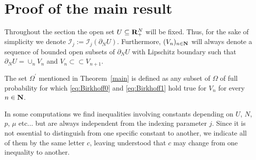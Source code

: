\documentclass[10pt,reqno]{amsart}
\numberwithin{equation}{section}
\def\N{{\bf N}}
\def\R{{\bf R}}
\def\Om{\Omega}
\def\Ieps{{\mathcal I}_j}
\def\UU{\partial_NU}
\begin{document}
\section{Proof of the main result}\label{mainresult}

Throughout the section the open set $U\subseteq\R^N_+$ will be
fixed. Thus, for the sake of simplicity we denote $\Ieps:=\Ieps(\UU)$.
Furthermore, $(V_n)_{n\in\N}$ will always denote a sequence of bounded
open subsets of $\UU$ with Lipschitz boundary such that $\UU=\cup_nV_n$ 
and $V_n\subset\subset V_{n+1}$.

The set $\Om^\prime$ mentioned in Theorem~\ref{main} is defined
as any subset of $\Om$ of full probability for which \eqref{eq:Birkhoff0}
and \eqref{eq:Birkhoff1} hold true for $V_n$ for every $n\in\N$.

In some computations we find inequalities involving constants
depending on $U$, $N$, $p$, $\mu$ etc... but are always independent
from the indexing parameter $j$. Since it is not essential to
distinguish from one
specific constant to another, we indicate all of them by the same letter $c$,
leaving understood that $c$ may change from one inequality to another.
\end{document}
